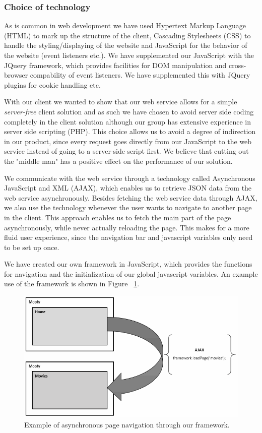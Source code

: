 \subsubsection{Choice of technology}

As is common in web development we have used Hypertext Markup Language (HTML) to mark up the structure of the client, Cascading Stylesheets (CSS) to handle the styling/displaying of the website and JavaScript for the behavior of the website (event listeners etc.). We have supplemented our JavaScript with the JQuery framework, which provides facilities for DOM manipulation and cross-browser compability of event listeners. We have supplemented this with JQuery plugins for cookie handling etc.

With our client we wanted to show that our web service allows for a simple \emph{server-free} client solution and as such we have chosen to avoid server side coding completely in the client solution although our group has extensive experience in server side scripting (PHP).
This choice allows us to avoid a degree of indirection in our product, since every request goes directly from our JavaScript to the web service instead of going to a server-side script first. We believe that cutting out the "middle man" has a positive effect on the performance of our solution.

We communicate with the web service through a technology called Asynchronous JavaScript and XML (AJAX), which enables us to retrieve JSON data from the web service asynchronously.
Besides fetching the web service data through AJAX, we also use the technology whenever the user wants to navigate to another page in the client. This approach enables us to fetch the main part of the page asynchronously, while never actually reloading the page. This makes for a more fluid user experience, since the navigation bar and javascript variables only need to be set up once.

We have created our own framework in JavaScript, which provides the functions for navigation and the initialization of our global javascript variables. An example use of the framework is shown in Figure ~\ref{fig:ajax}.

\begin{figure}[hbt]
	\centering
	\centerline{\includegraphics[scale=1]{./p1design/ajax.png}}
	\caption{Example of asynchronous page navigation through our framework.}
	\label{fig:ajax}
\end{figure}

